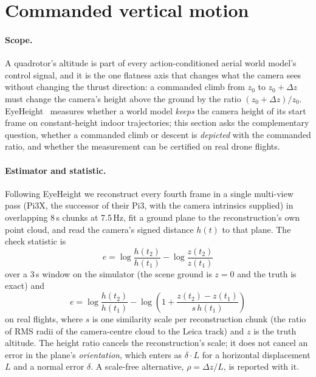 \section{Commanded vertical motion}
\label{sec:v-vertical}

\paragraph{Scope.}
A quadrotor's altitude is part of every action-conditioned aerial world model's control
signal, and it is the one flatness axis that changes what the camera sees without changing the
thrust direction: a commanded climb from $z_0$ to $z_0+\Delta z$ must change the camera's height
above the ground by the ratio $(z_0+\Delta z)/z_0$. EyeHeight~\cite{eyeheight2026} measures
whether a world model \emph{keeps} the camera height of its start frame on constant-height
indoor trajectories; this section asks the complementary question, whether a commanded climb or
descent is \emph{depicted} with the commanded ratio, and whether the measurement can be
certified on real drone flights.

\paragraph{Estimator and statistic.}
Following EyeHeight we reconstruct every fourth frame in a single multi-view pass (Pi3X, the
successor of their Pi3, with the camera intrinsics supplied) in overlapping 8\,s chunks at
7.5\,Hz, fit a ground plane to the reconstruction's own point cloud, and read the camera's
signed distance $h(t)$ to that plane. The check statistic is
\begin{equation}
e = \log\frac{h(t_2)}{h(t_1)} - \log\frac{z(t_2)}{z(t_1)}
\label{eq:v-height-ratio}
\end{equation}
over a 3\,s window on the simulator (the scene ground is $z=0$ and the truth is exact) and
\begin{equation}
e = \log\frac{h(t_2)}{h(t_1)} - \log\left(1 + \frac{z(t_2)-z(t_1)}{s\,h(t_1)}\right)
\label{eq:v-height-ratio-real}
\end{equation}
on real flights, where $s$ is one similarity scale per reconstruction chunk (the ratio of RMS
radii of the camera-centre cloud to the Leica track) and $z$ is the truth altitude. The height
ratio cancels the reconstruction's scale; it does not cancel an error in the plane's
\emph{orientation}, which enters as $\delta \cdot L$ for a horizontal displacement $L$ and a
normal error $\delta$. A scale-free alternative, $\rho = \Delta z / L$, is reported with it.

